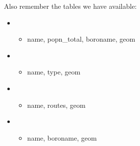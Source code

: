 \documentclass[a4paper,11pt,english]{sphinxmanual}
\begin{document}
Also remember the tables we have available:
\begin{itemize}
\item {} 
\begin{itemize}
\item {} 
name, popn\_total, boroname, geom

\end{itemize}

\item {} 
\begin{itemize}
\item {} 
name, type, geom

\end{itemize}

\item {} 
\begin{itemize}
\item {} 
name, routes, geom

\end{itemize}

\item {} 
\begin{itemize}
\item {} 
name, boroname, geom

\end{itemize}

\end{itemize}
\end{document}
